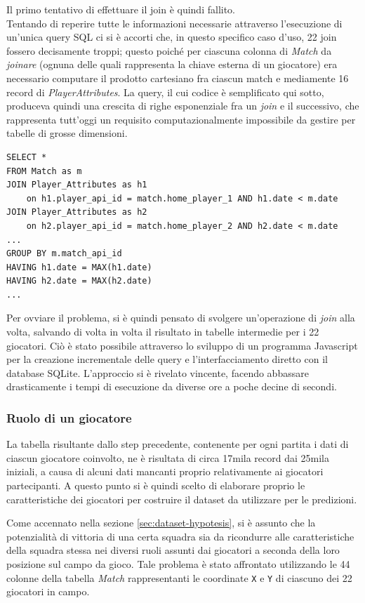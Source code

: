 \documentclass[hidelinks, 12pt]{article}
\begin{document}
Il primo tentativo di effettuare il join è quindi fallito. \\
Tentando di reperire tutte le informazioni necessarie attraverso l'esecuzione di un'unica query SQL ci si è accorti che, in questo specifico caso d'uso, 22 join fossero decisamente troppi; questo poiché per ciascuna colonna di \textit{Match} da \textit{joinare} (ognuna delle quali rappresenta la chiave esterna di un giocatore) era necessario computare il prodotto cartesiano fra ciascun match e mediamente 16 record di \textit{PlayerAttributes}. La query, il cui codice è semplificato qui sotto, produceva quindi una crescita di righe esponenziale fra un \textit{join} e il successivo, che rappresenta tutt'oggi un requisito computazionalmente impossibile da gestire per tabelle di grosse dimensioni.

\begin{verbatim}
SELECT *
FROM Match as m
JOIN Player_Attributes as h1 
	on h1.player_api_id = match.home_player_1 AND h1.date < m.date
JOIN Player_Attributes as h2 
	on h2.player_api_id = match.home_player_2 AND h2.date < m.date
...
GROUP BY m.match_api_id
HAVING h1.date = MAX(h1.date)
HAVING h2.date = MAX(h2.date)
...
\end{verbatim}

Per ovviare il problema, si è quindi pensato di svolgere un'operazione di \textit{join} alla volta, salvando di volta in volta il risultato in tabelle intermedie per i 22 giocatori. Ciò è stato possibile attraverso lo sviluppo di un programma Javascript per la creazione incrementale delle query e l'interfacciamento diretto con il database SQLite. L'approccio si è rivelato vincente, facendo abbassare drasticamente i tempi di esecuzione da diverse ore a poche decine di secondi.


\subsubsection{Ruolo di un giocatore}

La tabella risultante dallo step precedente, contenente per ogni partita i dati di ciascun giocatore coinvolto, ne è risultata di circa 17mila record dai 25mila iniziali, a causa di alcuni dati mancanti proprio relativamente ai giocatori partecipanti. A questo punto si è quindi scelto di elaborare proprio le caratteristiche dei giocatori per costruire il dataset da utilizzare per le predizioni.

Come accennato nella sezione \ref{sec:dataset-hypotesis}, si è assunto che la potenzialità di vittoria di una certa squadra sia da ricondurre alle caratteristiche della squadra stessa nei diversi ruoli assunti dai giocatori a seconda della loro posizione sul campo da gioco. Tale problema è stato affrontato utilizzando le 44 colonne della tabella \textit{Match} rappresentanti le coordinate \texttt{X} e \texttt{Y} di ciascuno dei 22 giocatori in campo.
\end{document}

